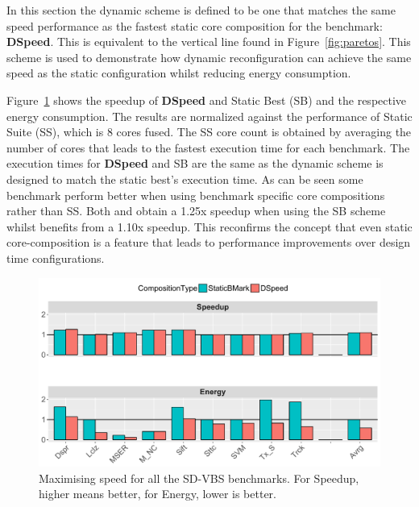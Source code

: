 In this section the dynamic scheme is defined to be one that matches the same speed performance as the fastest static core composition for the benchmark: \textbf{DSpeed}.
This is equivalent to the vertical line found in Figure~\ref{fig:paretos}.
This scheme is used to demonstrate how dynamic reconfiguration can achieve the same speed as the static configuration whilst reducing energy consumption.

Figure~\ref{fig:speedres} shows the speedup of \textbf{DSpeed} and Static Best (SB) and the respective energy consumption.
The results are normalized against the performance of Static Suite (SS), which is 8 cores fused.
The SS core count is obtained by averaging the number of cores that leads to the fastest execution time for each benchmark.
The execution times for \textbf{DSpeed} and SB are the same as the dynamic scheme is designed to match the static best's execution time.
As can be seen some benchmark perform better when using benchmark specific core compositions rather than SS.
Both  and  obtain a 1.25x speedup when using the SB scheme whilst  benefits from a 1.10x speedup.
This reconfirms the concept that even static core-composition is a feature that leads to performance improvements over design time configurations.

\begin{figure}[t]
    \centering
	\includegraphics[width=1\textwidth]{cases-paper/graphics/results/speed_bars3.pdf}
    \caption{Maximising speed for all the SD-VBS benchmarks. For Speedup, higher means better, for Energy, lower is better.}
    \label{fig:speedres}
	\vspace{1em}
\end{figure}

